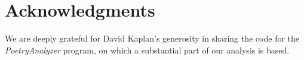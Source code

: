 \documentclass{book}
\begin{document}


\section*{Acknowledgments}
We are deeply grateful for David Kaplan's generosity in sharing the code for the \emph{PoetryAnalyzer} program, on which a substantial part of our analysis is based. 



\end{document}
